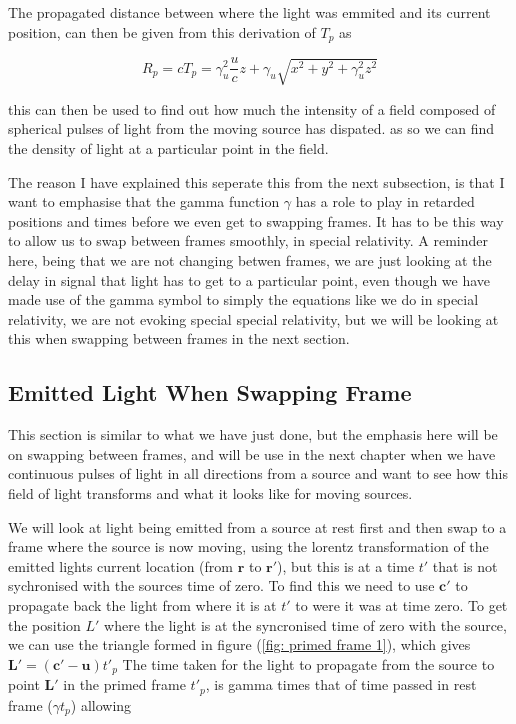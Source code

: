 
The propagated distance between where the light was emmited and its current position, can then be given from this derivation of $T_{p}$ as

\begin{equation}
	R_{p} = cT_{p} = \gamma_u^2 \frac{u}{c}z + \gamma_u \sqrt{x^2 + y^2 + \gamma_u^2 z^2}
\end{equation}

this can then be used to find out how much the intensity of a field composed of spherical pulses of light from the moving source has dispated. as so we can find the density of light at a particular point in the field.

The reason I have explained this seperate this from the next subsection, is that I want to emphasise that the gamma function $\gamma$ has a role to play in retarded positions and times before we even get to swapping frames.
It has to be this way to allow us to swap between frames smoothly, in special relativity.
A reminder here, being that we are not changing betwen frames, we are just looking at the delay in signal that light has to get to a particular point, even though we have made use of the gamma symbol to simply the equations like we do in special relativity, we are not evoking special special relativity, but we will be looking at this when swapping between frames in the next section.

\subsection{Emitted Light When Swapping Frame}\label{subsect: Emitted Light When Swapping Frame}

This section is similar to what we have just done, but the emphasis here will be on swapping between frames, and will be use in the next chapter when we have continuous pulses of light in all directions from a source and want to see how this field of light transforms and what it looks like for moving sources.


We will look at light being emitted from a source at rest first and then swap to a frame where the source is now moving, using the lorentz transformation of the emitted lights current location (from $\mathbf{r}$ to $\mathbf{r}{'}$), but this is at a time $t'$ that is not sychronised with the sources time of zero.
To find this we need to use $\mathbf{c}{'}$ to propagate back the light from where it is at $t'$ to were it was at time zero.
To get the position $L'$ where the light is at the syncronised time of zero with the source, we can use the triangle formed in figure (\ref{fig: primed frame 1}), which gives $\mathbf{L}' = (\mathbf{c}' - \mathbf{u}) t'_p$
The time taken for the light to propagate from the source to point $\mathbf{L}'$ in the primed frame $t'_p$, is gamma times that of time passed in rest frame ($\gamma t_p$)
allowing

